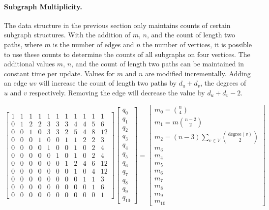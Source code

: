 \documentclass[11pt]{article}
\renewcommand{\subsection}[1]{\paragraph{\textbf{#1}.}}
\begin{document}
\subsection{Subgraph Multiplicity}
The data structure in the previous section only maintains counts of certain subgraph structures.  With the addition of $m$, $n$, and the count of length two paths, where $m$ is the number of edges and $n$ the number of vertices, it is possible to use these counts to determine the counts of all subgraphs on four vertices.  The additional values $m$, $n$, and the count of length two paths can be maintained in constant time per update.  Values for $m$ and $n$ are modified incrementally.  Adding an edge $uv$ will increase the count of length two paths by $d_u + d_v$, the degrees of $u$ and $v$ respectively. Removing the edge will decrease the value by $d_u + d_v - 2$.

\setcounter{MaxMatrixCols}{11}
{\small
\[
\begin{bmatrix}
1&1&1&1&1&1&1&1&1&1&1\\
0&1&2&2&3&3&3&4&4&5&6\\
0&0&1&0&3&3&2&5&4&8&12\\
0&0&0&1&0&0&1&1&2&2&3\\
0&0&0&0&1&0&0&1&0&2&4\\
0&0&0&0&0&1&0&1&0&2&4\\
0&0&0&0&0&0&1&2&4&6&12\\
0&0&0&0&0&0&0&1&0&4&12\\
0&0&0&0&0&0&0&0&1&1&3\\
0&0&0&0&0&0&0&0&0&1&6\\
0&0&0&0&0&0&0&0&0&0&1
\end{bmatrix}
\begin{bmatrix}
q_0\\
q_1\\
q_2\\
q_3\\
q_4\\
q_5\\
q_6\\
q_7\\
q_8\\
q_9\\
q_{10}
\end{bmatrix}
=
\begin{bmatrix}
m_0 = \binom{n}{4}\\
m_1 = m\binom{n-2}{2}\\
m_2 = (n-3)\sum_{v\in V}\binom{\mathrm{degree}(v)}{2}\\
m_3\\
m_4\\
m_5\\
m_6\\
m_7\\
m_8\\
m_9\\
m_{10}
\end{bmatrix}
\]
}
\end{document}
